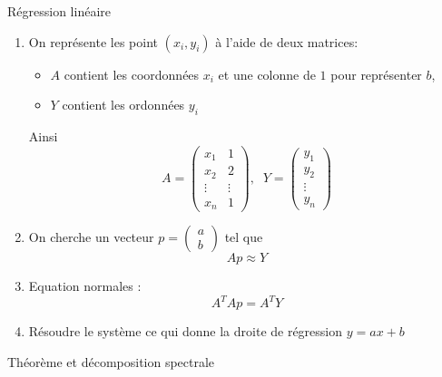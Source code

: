 \begin{parag}{Régression linéaire}
    \begin{enumerate}
        \item On représente les point $(x_i, y_i)$ à l'aide de deux matrices:
        \begin{itemize}
            \item $A$ contient les coordonnées $x_i$ et une colonne de $1$ pour représenter $b$, 
            \item $Y$ contient les ordonnées $y_i$
        \end{itemize}
        Ainsi
        \[A = \begin{pmatrix}
            x_1 & 1\\
            x_2 & 2\\
            \vdots & \vdots\\
            x_n & 1
        \end{pmatrix}, \; \; Y = \begin{pmatrix}
            y_1 \\ y_2 \\ \vdots \\ y_n
        \end{pmatrix}\]
        \item On cherche un vecteur $p = \begin{pmatrix}
            a \\ b
        \end{pmatrix}$ tel que
        \[Ap \approx Y\]
        \item Equation normales : 
        \[A^TAp = A^TY\]
        \item Résoudre le système ce qui donne la droite de régression $y = ax + b$
    \end{enumerate}
\end{parag}

\begin{parag}{Théorème et décomposition spectrale}
    
\end{parag}